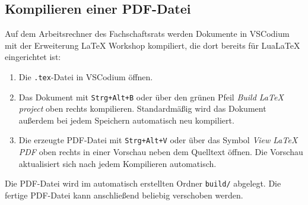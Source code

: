 \subsection{Kompilieren einer PDF-Datei}
\label{latex-kompilieren}
Auf dem Arbeitsrechner des Fachschaftsrats werden Dokumente in VSCodium mit der Erweiterung LaTeX Workshop kompiliert, die dort bereits für LuaLaTeX eingerichtet ist:

\begin{enumerate}
	\item Die \texttt{.tex}-Datei in VSCodium öffnen.
	\item Das Dokument mit \texttt{Strg+Alt+B} oder über den grünen Pfeil \textit{Build LaTeX project} oben rechts kompilieren. Standardmäßig wird das Dokument außerdem bei jedem Speichern automatisch neu kompiliert.
	\item Die erzeugte PDF-Datei mit \texttt{Strg+Alt+V} oder über das Symbol \textit{View LaTeX PDF} oben rechts in einer Vorschau neben dem Quelltext öffnen. Die Vorschau aktualisiert sich nach jedem Kompilieren automatisch.
\end{enumerate}

Die PDF-Datei wird im automatisch erstellten Ordner \texttt{build/} abgelegt. Die fertige PDF-Datei kann anschließend beliebig verschoben werden.
